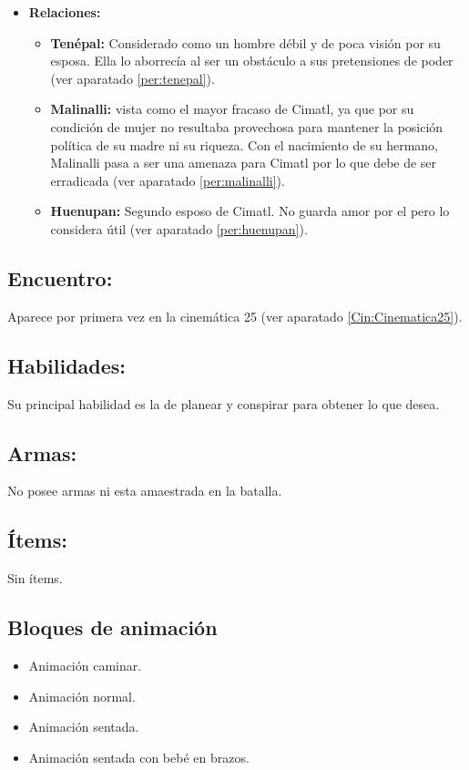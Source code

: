 \begin{itemize}
	\item \textbf{Relaciones:}
	\begin{itemize}
		\item \textbf{Tenépal:} Considerado como un hombre débil y de poca visión por su esposa. Ella lo aborrecía al ser un obstáculo a sus pretensiones de poder (ver aparatado \ref{per:tenepal}). 
		\item \textbf{Malinalli:} vista como el mayor fracaso de Cimatl, ya que por su condición de mujer no resultaba provechosa para mantener la posición política de su madre ni su riqueza. Con el nacimiento de su hermano, Malinalli pasa a ser una amenaza para Cimatl por lo que debe de ser erradicada (ver aparatado \ref{per:malinalli}).
		\item \textbf{Huenupan:} Segundo esposo de Cimatl. No guarda amor por el pero lo considera útil (ver aparatado \ref{per:huenupan}).
	\end{itemize}                     
\end{itemize}

\subsection{Encuentro:}
Aparece por primera vez en la cinemática 25 (ver aparatado \ref{Cin:Cinematica25}).
\subsection{Habilidades:}
Su principal habilidad es la de planear y conspirar para obtener lo que desea.
\subsection{Armas:}
No posee armas ni esta amaestrada en la batalla.
\subsection{Ítems:}
Sin ítems.
\subsection{Bloques de animación}
\begin{itemize}
	\item Animación caminar.
	\item Animación normal.
	\item Animación sentada.
	\item Animación sentada con bebé en brazos.
\end{itemize}